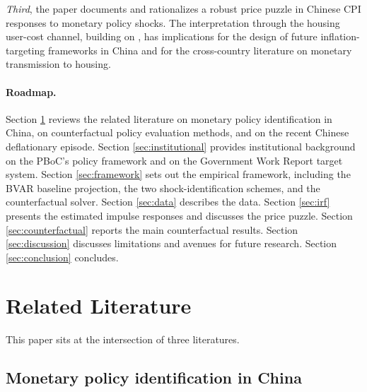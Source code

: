 \documentclass[12pt, a4paper]{article}
\begin{document}
\textit{Third}, the paper documents and rationalizes a robust price puzzle in Chinese CPI responses to monetary policy shocks. The interpretation through the housing user-cost channel, building on \citet{chodorow2025}, has implications for the design of future inflation-targeting frameworks in China and for the cross-country literature on monetary transmission to housing.

\paragraph{Roadmap.} Section \ref{sec:litreview} reviews the related literature on monetary policy identification in China, on counterfactual policy evaluation methods, and on the recent Chinese deflationary episode. Section \ref{sec:institutional} provides institutional background on the PBoC's policy framework and on the Government Work Report target system. Section \ref{sec:framework} sets out the empirical framework, including the BVAR baseline projection, the two shock-identification schemes, and the counterfactual solver. Section \ref{sec:data} describes the data. Section \ref{sec:irf} presents the estimated impulse responses and discusses the price puzzle. Section \ref{sec:counterfactual} reports the main counterfactual results. Section \ref{sec:discussion} discusses limitations and avenues for future research. Section \ref{sec:conclusion} concludes.

\section{Related Literature}\label{sec:litreview}

This paper sits at the intersection of three literatures.

\subsection{Monetary policy identification in China}

\end{document}
